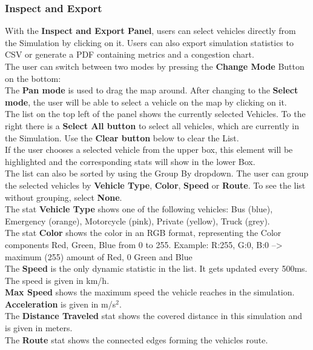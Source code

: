 \documentclass[a4paper, 12pt]{article}
\begin{document}
\subsubsection{Inspect and Export} 
With the \textbf{Inspect and Export Panel}, users can select vehicles directly from the Simulation by clicking on it. Users can also export simulation statistics to CSV or generate a PDF containing metrics and a congestion chart. \\
The user can switch between two modes by pressing the \textbf{Change Mode} Button on the bottom: \\
The \textbf{Pan mode} is used to drag the map around. After changing to the \textbf{Select mode}, the user will be able to select a vehicle on the map by clicking on it.\\
The list on the top left of the panel shows the currently selected Vehicles. To the right there is a \textbf{Select All button} to select all vehicles, which are currently in the Simulation. Use the \textbf{Clear button} below to clear the List.\\
If the user chooses a selected vehicle from the upper box, this element will be highlighted and the corresponding stats will show in the lower Box.\\
The list can also be sorted by using the Group By dropdown. The user can group the selected vehicles by \textbf{Vehicle Type}, \textbf{Color}, \textbf{Speed} or \textbf{Route}. To see the list without grouping, select \textbf{None}.\\
The stat \textbf{Vehicle Type} shows one of the following vehicles:
Bus (blue), Emergency (orange), Motorcycle (pink), Private (yellow), Truck (grey).\\
The stat \textbf{Color} shows the color in an RGB format, representing the Color components Red, Green, Blue from 0 to 255. 
Example: R:255, G:0, B:0 --> maximum (255) amount of Red, 0 Green and Blue\\
The \textbf{Speed} is the only dynamic statistic in the list. It gets updated every 500ms. The speed is given in km/h.\\
\textbf{Max Speed} shows the maximum speed the vehicle reaches in the simulation. \\
\textbf{Acceleration} is given in m/s$^2$.\\
The \textbf{Distance Traveled} stat shows the covered distance in this simulation and is given in meters.\\
The \textbf{Route} stat shows the connected edges forming the vehicles route.
\end{document}

